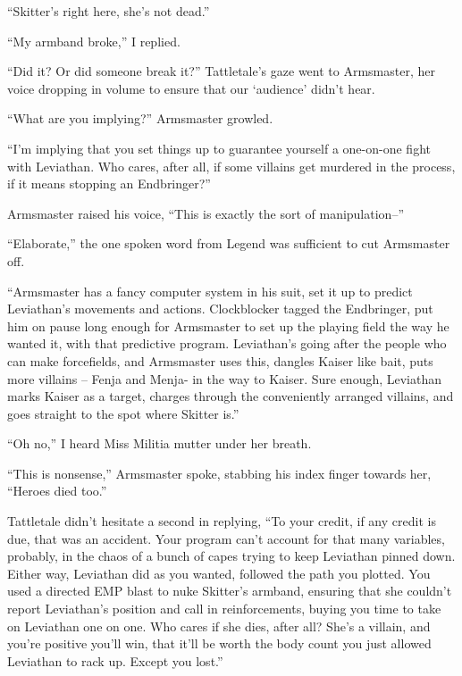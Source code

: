``Skitter's right here, she's not dead.''



``My armband broke,'' I replied.



``Did it?  Or did someone break it?''  Tattletale's gaze went to Armsmaster, her voice dropping in volume to ensure that our `audience' didn't hear.



``What are you implying?''  Armsmaster growled.



``I'm implying that you set things up to guarantee yourself a one-on-one fight with Leviathan.  Who cares, after all, if some villains get murdered in the process, if it means stopping an Endbringer?''



Armsmaster raised his voice, ``This is exactly the sort of manipulation--''



``Elaborate,'' the one spoken word from Legend was sufficient to cut Armsmaster off.



``Armsmaster has a fancy computer system in his suit, set it up to predict Leviathan's movements and actions.  Clockblocker tagged the Endbringer, put him on pause long enough for Armsmaster to set up the playing field the way he wanted it, with that predictive program.  Leviathan's going after the people who can make forcefields, and Armsmaster uses this, dangles Kaiser like bait, puts more villains – Fenja and Menja- in the way to Kaiser.  Sure enough, Leviathan marks Kaiser as a target, charges through the conveniently arranged villains, and goes straight to the spot where Skitter is.''



``Oh no,'' I heard Miss Militia mutter under her breath.



``This is nonsense,'' Armsmaster spoke, stabbing his index finger towards her, ``Heroes died too.''



Tattletale didn't hesitate a second in replying, ``To your credit, if any credit is due, that was an accident.  Your program can't account for that many variables, probably, in the chaos of a bunch of capes trying to keep Leviathan pinned down.  Either way, Leviathan did as you wanted, followed the path you plotted.  You used a directed EMP blast to nuke Skitter's armband, ensuring that she couldn't report Leviathan's position and call in reinforcements, buying you time to take on Leviathan one on one.  Who cares if she dies, after all?  She's a villain, and you're positive you'll win, that it'll be worth the body count you just allowed Leviathan to rack up.  Except you lost.''



